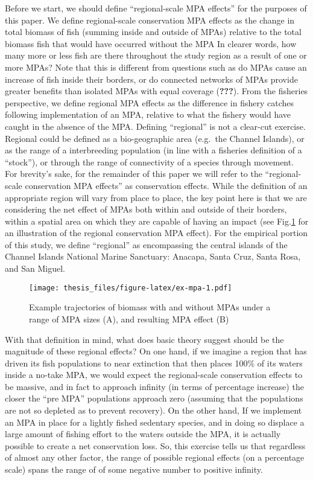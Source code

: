 \documentclass[twoside,12pt,final]{ucthesis-CA2012}
\begin{document}
\begin{ucmainmatter}
Before we start, we should define ``regional-scale MPA effects'' for the
purposes of this paper. We define regional-scale conservation MPA
effects as the change in total biomass of fish (summing inside and
outside of MPAs) relative to the total biomass fish that would have
occurred without the MPA In clearer words, how many more or less fish
are there throughout the study region as a result of one or more MPAs?
Note that this is different from questions such as do MPAs cause an
increase of fish inside their borders, or do connected networks of MPAs
provide greater benefits than isolated MPAs with equal coverage
({\textbf{???}}). From the fisheries perspective, we define regional MPA
effects as the difference in fishery catches following implementation of
an MPA, relative to what the fishery would have caught in the absence of
the MPA. Defining ``regional'' is not a clear-cut exercise. Regional
could be defined as a bio-geographic area (e.g.~the Channel Islands), or
as the range of a interbreeding population (in line with a fisheries
definition of a ``stock''), or through the range of connectivity of a
species through movement. For brevity's sake, for the remainder of this
paper we will refer to the ``regional-scale conservation MPA effects''
as conservation effects. While the definition of an appropriate region
will vary from place to place, the key point here is that we are
considering the net effect of MPAs both within and outside of their
borders, within a spatial area on which they are capable of having an
impact (see Fig.\ref{fig:ex-mpa} for an illustration of the regional
conservation MPA effect). For the empirical portion of this study, we
define ``regional'' as encompassing the central islands of the Channel
Islands National Marine Sanctuary: Anacapa, Santa Cruz, Santa Rosa, and
San Miguel.
\begin{figure}
\centering
\texttt{[image: thesis\_files/figure-latex/ex-mpa-1.pdf]}
\caption{\label{fig:ex-mpa}Example trajectories of biomass with and without
MPAs under a range of MPA sizes (A), and resulting MPA effect (B)}
\end{figure}
With that definition in mind, what does basic theory suggest should be
the magnitude of these regional effects? On one hand, if we imagine a
region that has driven its fish populations to near extinction that then
places 100\% of its waters inside a no-take MPA, we would expect the
regional-scale conservation effects to be massive, and in fact to
approach infinity (in terms of percentage increase) the closer the ``pre
MPA'' populations approach zero (assuming that the populations are not
so depleted as to prevent recovery). On the other hand, If we implement
an MPA in place for a lightly fished sedentary species, and in doing so
displace a large amount of fishing effort to the waters outside the MPA,
it is actually possible to create a net conservation loss. So, this
exercise tells us that regardless of almost any other factor, the range
of possible regional effects (on a percentage scale) spans the range of
of some negative number to positive infinity.


\end{ucmainmatter}
\end{document}
